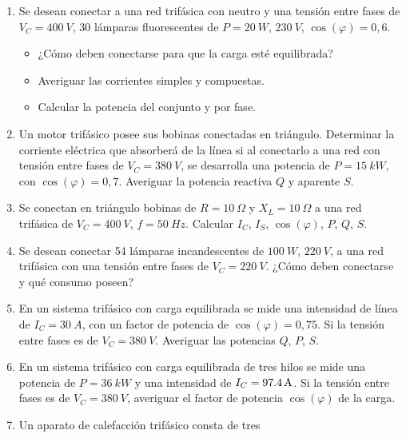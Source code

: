 \documentclass[../main]{subfiles}
\begin{document}
\begin{enumerate}
    trifásica de $V_C=\qty{220}{V}$, $f=\qty{50}{Hz}$. Cada una de las
    mismas posee $R=\qty{12}{\Omega}$ de resistencia, y
    $X_L=\qty{20}{\Omega}$ de reactancia inductiva. Calcular la
    impedancia $Z$, corrientes simples, factor de potencia
    $\cos(\varphi)$, potencia activa $P$, potencia reactiva $Q$ y
    potencia aparente $S$.
  \item Se desean conectar a una red trifásica con neutro y una
    tensión entre fases de $V_C=\qty{400}{V}$, 30 lámparas
    fluorescentes de $P=\qty{20}{W}$, $\qty{230}{V}$,
    $\cos(\varphi)=0{,}6$.
    \begin{itemize}
      \item ¿Cómo deben conectarse para que la carga esté equilibrada?
      \item Averiguar las corrientes simples y compuestas.
      \item Calcular la potencia del conjunto y por fase.
    \end{itemize}
  \item Un motor trifásico posee sus bobinas conectadas en triángulo.
    Determinar la corriente eléctrica que absorberá de la línea si al
    conectarlo a una red con tensión entre fases de
    $V_C=\qty{380}{V}$, se desarrolla una potencia de
    $P=\qty{15}{kW}$, con $\cos(\varphi)=0{,}7$. Averiguar la potencia
    reactiva $Q$ y aparente $S$.
  \item Se conectan en triángulo bobinas de $R=\qty{10}{\Omega}$ y
    $X_L=\qty{10}{\Omega}$ a una red trifásica de $V_C=\qty{400}{V}$,
    $f=\qty{50}{Hz}$. Calcular $I_C$, $I_S$, $\cos(\varphi)$, $P$,
    $Q$, $S$.
  \item Se desean conectar 54 lámparas incandescentes de
    $\qty{100}{W}$, $\qty{220}{V}$, a una red trifásica con una
    tensión entre fases de $V_C=\qty{220}{V}$. ¿Cómo deben conectarse
    y qué consumo poseen?
  \item En un sistema trifásico con carga equilibrada se mide una
    intensidad de línea de $I_C=\qty{30}{A}$, con un factor de
    potencia de $\cos(\varphi)=0{,}75$. Si la tensión entre fases es
    de $V_C=\qty{380}{V}$. Averiguar las potencias $Q$, $P$, $S$.
  \item En un sistema trifásico con carga equilibrada de tres hilos
    se mide una potencia de $P=\qty{36}{kW}$ y una intensidad de
    $I_C=\qty{97{,}4}{A}$. Si la tensión entre fases es de
    $V_C=\qty{380}{V}$, averiguar el factor de potencia
    $\cos(\varphi)$ de la carga.
  \item Un aparato de calefacción trifásico consta de tres

\end{enumerate}
\end{document}
